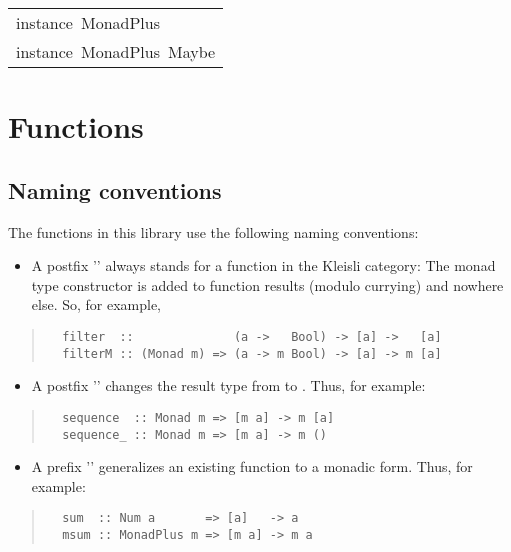 \begin{haddockdesc}
\item[\begin{tabular}{@{}l}
instance\ MonadPlus\ {\char 91}{\char 93}\\instance\ MonadPlus\ Maybe
\end{tabular}]
\end{haddockdesc}
\section{Functions
}
\subsection{Naming conventions
}
The functions in this library use the following naming conventions: 
\par
\begin{itemize}
\item
 A postfix '' always stands for a function in the Kleisli category:
  The monad type constructor  is added to function results
  (modulo currying) and nowhere else.  So, for example, 
\par

\end{itemize}
\begin{quote}
{\haddockverb\begin{verbatim}
  filter  ::              (a ->   Bool) -> [a] ->   [a]
  filterM :: (Monad m) => (a -> m Bool) -> [a] -> m [a]
\end{verbatim}}
\end{quote}
\begin{itemize}
\item
 A postfix '' changes the result type from  to .
  Thus, for example: 
\par

\end{itemize}
\begin{quote}
{\haddockverb\begin{verbatim}
  sequence  :: Monad m => [m a] -> m [a] 
  sequence_ :: Monad m => [m a] -> m () 
\end{verbatim}}
\end{quote}
\begin{itemize}
\item
 A prefix '' generalizes an existing function to a monadic form.
  Thus, for example: 
\par

\end{itemize}
\begin{quote}
{\haddockverb\begin{verbatim}
  sum  :: Num a       => [a]   -> a
  msum :: MonadPlus m => [m a] -> m a
\end{verbatim}}
\end{quote}

